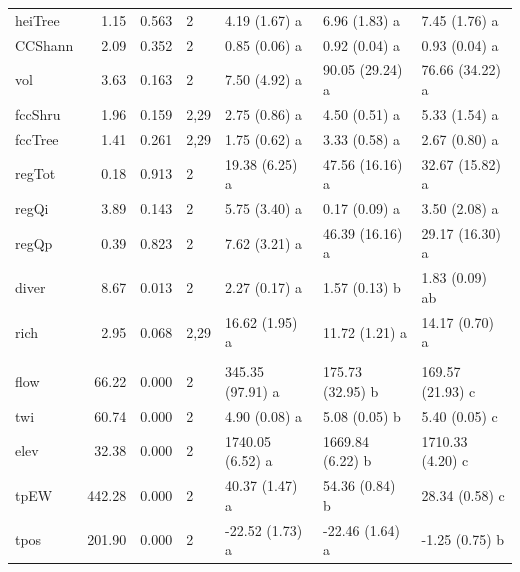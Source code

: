 \begin{table}
\begin{tabular}{lrrllll}
\hspace{1em}heiTree & 1.15 & 0.563 & 2 & 4.19 (1.67) a & 6.96 (1.83) a & 7.45 (1.76) a\\
\hspace{1em}CCShann & 2.09 & 0.352 & 2 & 0.85 (0.06) a & 0.92 (0.04) a & 0.93 (0.04) a\\
\hspace{1em}vol & 3.63 & 0.163 & 2 & 7.50 (4.92) a & 90.05 (29.24) a & 76.66 (34.22) a\\
\hspace{1em}fccShru & 1.96 & 0.159 & 2,29 & 2.75 (0.86) a & 4.50 (0.51) a & 5.33 (1.54) a\\
\hspace{1em}fccTree & 1.41 & 0.261 & 2,29 & 1.75 (0.62) a & 3.33 (0.58) a & 2.67 (0.80) a\\
\hspace{1em}regTot & 0.18 & 0.913 & 2 & 19.38 (6.25) a & 47.56 (16.16) a & 32.67 (15.82) a\\
\hspace{1em}regQi & 3.89 & 0.143 & 2 & 5.75 (3.40) a & 0.17 (0.09) a & 3.50 (2.08) a\\
\hspace{1em}regQp & 0.39 & 0.823 & 2 & 7.62 (3.21) a & 46.39 (16.16) a & 29.17 (16.30) a\\
\hspace{1em}diver & 8.67 & 0.013 & 2 & 2.27 (0.17) a & 1.57 (0.13) b & 1.83 (0.09) ab\\
\hspace{1em}rich & 2.95 & 0.068 & 2,29 & 16.62 (1.95) a & 11.72 (1.21) a & 14.17 (0.70) a\\
\addlinespace[0.3em]
\multicolumn{7}{l}{\textbf{Environmental}}\\
\hspace{1em}flow & 66.22 & 0.000 & 2 & 345.35 (97.91) a & 175.73 (32.95) b & 169.57 (21.93) c\\
\hspace{1em}twi & 60.74 & 0.000 & 2 & 4.90 (0.08) a & 5.08 (0.05) b & 5.40 (0.05) c\\
\hspace{1em}elev & 32.38 & 0.000 & 2 & 1740.05 (6.52) a & 1669.84 (6.22) b & 1710.33 (4.20) c\\
\hspace{1em}tpEW & 442.28 & 0.000 & 2 & 40.37 (1.47) a & 54.36 (0.84) b & 28.34 (0.58) c\\
\hspace{1em}tpos & 201.90 & 0.000 & 2 & -22.52 (1.73) a & -22.46 (1.64) a & -1.25 (0.75) b\\

\end{tabular}
\end{table}
